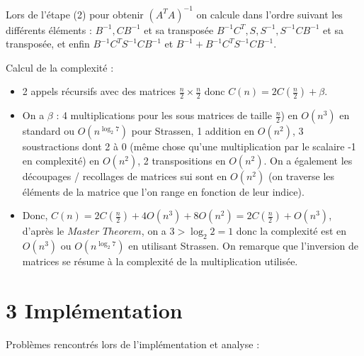 \documentclass[a4paper,fleqn]{article}
\begin{document}
Lors de l'étape (2) pour obtenir $\left(A^{T} A\right)^{-1}$ on calcule dans l'ordre suivant les différents éléments : $B^{-1}, C B^{-1}$ et sa transposée $B^{-1} C^{T}, S, S^{-1}, S^{-1} C B^{-1}$ et sa transposée, et enfin $B^{-1} C^{T} S^{-1} C B^{-1}$ et $B^{-1}+B^{-1} C^{T} S^{-1} C B^{-1}$. \newline

 Calcul de la complexité :
\begin{itemize} 

\item 2 appels récursifs avec des matrices  $\frac{n}{2} \times \frac{n}{2}$ donc $C(n) = 2C\left(\frac{n}{2}\right) + \beta$.

\item  On a $\beta$ : 4 multiplications  pour les sous matrices de taille $\frac{n}{2}$) en $O(n^3)$ en standard ou $O(n^{\log_2 7})$ pour Strassen, 1 addition en $O(n^2)$, 3 soustractions dont 2 à 0 (même chose qu'une multiplication par le scalaire -1 en complexité) en $O(n^2)$, 2 transpositions en $O(n^2)$. On a également les découpages / recollages de matrices sui sont en $O(n^2)$ (on traverse les éléments de la matrice que l'on range en fonction de leur indice).

\item Donc, $C(n) = 2C\left(\frac{n}{2}\right) + 4O(n^3) + 8O(n^2) = 2C\left(\frac{n}{2}\right) + O(n^3)$, d'après le $Master$ $Theorem$, on a $3 > \log_2 2 = 1$ donc la complexité est en $O(n^3)$ ou $O(n^{\log_2 7})$ en utilisant Strassen. On remarque que l'inversion de matrices se résume à la complexité de la multiplication utilisée.

\end{itemize}

\break
\section*{3 Implémentation}
Problèmes rencontrés lors de l'implémentation et analyse :
\end{document}
